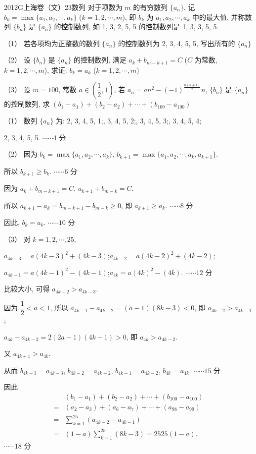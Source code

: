 
\begin{problem}{2012}{G}{上海卷（文）}{23}{数列}
对于项数为 $m$ 的有穷数列 $\{a_n\}$, 记 $b_k = \max \{a_1, a_2, \cdots, a_k\}$ ($k=1, 2, \cdots, m$), 即 $b_k$ 为 $a_1, a_2, \cdots, a_k$ 中的最大值, 并称数列 $\{b_n\}$ 是 $\{a_n\}$ 的控制数列, 如 1, 3, 2, 5, 5 的控制数列是 1, 3, 3, 5, 5.

（1） 若各项均为正整数的数列 $\{a_n\}$ 的控制数列为 2, 3, 4, 5, 5, 写出所有的 $\{a_n\}$

（2） 设 $\{b_n\}$ 是 $\{a_n\}$ 的控制数列, 满足 $a_k + b_{m-k+1} = C$ ($C$ 为常数, $k=1, 2, \cdots, m$), 求证: $b_k = a_k$ ($k=1, 2, \cdots, m$)

（3） 设 $m=100$, 常数 $a \in \left(\dfrac{1}{2}, 1\right)$, 若 $a_n = a n^2 - (-1)^{\frac{n(n+1)}{2}} n$, $\{b_n\}$ 是 $\{a_n\}$ 的控制数列, 求 $(b_1 - a_1) + (b_2 - a_2) + \cdots + (b_{100} - a_{100})$
\end{problem}

\begin{solutions}
（1） 数列 $\{a_n\}$ 为: 2, 3, 4, 5, 1;, 3, 4, 5, 2;, 3, 4, 5, 3;, 3, 4, 5, 4;\quad 

2, 3, 4, 5, 5. \hfill $\cdots\cdots 4$ 分

（2） 因为 $b_k = \max \{a_1, a_2, \cdots, a_k\}$, $b_{k+1} = \max \{a_1, a_2, \cdots, a_k, a_{k+1}\}$.

所以 $b_{k+1} \ge b_k$. \hfill $\cdots\cdots 6$ 分

因为 $a_k + b_{m-k+1} = C$, $a_{k+1} + b_{m-k} = C$.

所以 $a_{k+1} - a_k = b_{m-k+1} - b_{m-k} \ge 0$, 即 $a_{k+1} \ge a_k$. \hfill $\cdots\cdots 8$ 分

因此, $b_k = a_k$. \hfill $\cdots\cdots 10$ 分

（3） 对 $k=1, 2, \cdots, 25$,

$a_{4k-3} = a(4k-3)^2 + (4k-3)$;\quad   $a_{4k-2} = a(4k-2)^2 + (4k-2)$;

$a_{4k-1} = a(4k-1)^2 - (4k-1)$;\quad   $a_{4k} = a(4k)^2 - (4k)$. \hfill $\cdots\cdots 12$ 分

比较大小, 可得 $a_{4k-2} > a_{4k-3}$.

因为 $\dfrac{1}{2} < a < 1$, 所以 $a_{4k-1} - a_{4k-2} = (a-1)(8k-3) < 0$, 即 $a_{4k-2} > a_{4k-1}$;

$a_{4k} - a_{4k-2} = 2(2a-1)(4k-1) > 0$, 即 $a_{4k} > a_{4k-2}$.

又 $a_{4k+1} > a_{4k}$.

从而 $b_{4k-3} = a_{4k-3}$, $b_{4k-2} = a_{4k-2}$, $b_{4k-1} = a_{4k-2}$, $b_{4k} = a_{4k}$. \hfill $\cdots\cdots 15$ 分

因此 
\begin{align*}
& (b_1 - a_1) + (b_2 - a_2) + \cdots + (b_{100} - a_{100})  \\
=& (a_2 - a_3) + (a_6 - a_7) + \cdots + (a_{98} - a_{99})   \\ 
=& \sum_{k=1}^{25} (a_{4k-2} - a_{4k-1})\\
=& (1-a) \sum_{k=1}^{25} (8k-3) = 2525(1-a).
\end{align*}
 \hfill $\cdots\cdots 18$ 分
\end{solutions}
